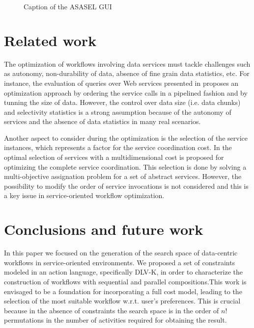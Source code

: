 \documentclass{acm_proc_article-sp}
\begin{document}
	\begin{figure}
   \begin{center}
   \end{center}
   \caption{Caption of the ASASEL GUI}
   \label{fig:asaselGUI}
\end{figure}
	
\section{Related work} \label{sec:relatedwork}

The optimization of workflows involving data services must tackle challenges such as autonomy, non-durability of data, absence of fine grain data statistics, etc. For instance, the evaluation of queries over Web services presented in \cite{Srivastava2006} proposes an optimization approach by ordering the service calls in a pipelined fashion and by tunning the size of data. However, the control over data size (i.e. data chunks) and selectivity statistics is a strong assumption because of the autonomy of services and the absence of data statistics in many real scenarios.

Another aspect to consider during the optimization is the selection of the service instances, which represents a factor for the service coordination cost. In \cite{Claro2005,Wada2008} the optimal selection of services with a multidimensional cost is proposed for optimizing the complete service coordination. This selection is done by solving a multi-objective assignation problem for a set of abstract services. However, the possibility to modify the order of service invocations is not considered and this is a key issue in service-oriented workflow optimization.

\section{Conclusions and future work} \label{sec:conclusion}

In this paper we focused on the generation of the search space of data-centric workflows in service-oriented environments. We proposed a set of constraints modeled in an action language, specifically DLV-K, in order to characterize the construction of workflows with sequential and parallel compositions.This work is envisaged to be a foundation for incorporating a full cost model, leading to the selection of the most suitable workflow w.r.t. user's preferences. This is crucial because in the absence of constraints the search space is in the order of $n!$ permutations in the number of activities required for obtaining the result.
\end{document}
